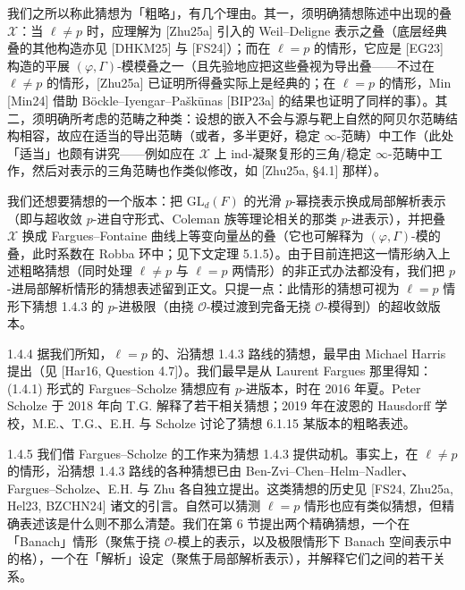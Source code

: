 我们之所以称此猜想为「粗略」，有几个理由。其一，须明确猜想陈述中出现的叠 $\mathcal X$：当 $\ell\neq p$ 时，应理解为 [Zhu25a] 引入的 Weil--Deligne 表示之叠（底层经典叠的其他构造亦见 [DHKM25] 与 [FS24]）；而在 $\ell=p$ 的情形，它应是 [EG23] 构造的平展 $(\varphi,\Gamma)$-模模叠之一（且先验地应把这些叠视为导出叠——不过在 $\ell\neq p$ 的情形，[Zhu25a] 已证明所得叠实际上是经典的；在 $\ell=p$ 的情形，Min [Min24] 借助 Böckle--Iyengar--Paškūnas [BIP23a] 的结果也证明了同样的事）。其二，须明确所考虑的范畴之种类：设想的嵌入不会与源与靶上自然的阿贝尔范畴结构相容，故应在适当的导出范畴（或者，多半更好，稳定 $\infty$-范畴）中工作（此处「适当」也颇有讲究——例如应在 $\mathcal X$ 上 ind-凝聚复形的三角/稳定 $\infty$-范畴中工作，然后对表示的三角范畴也作类似修改，如 [Zhu25a, §4.1] 那样）。

我们还想要猜想的一个版本：把 $\mathrm{GL}_d(F)$ 的光滑 $p$-幂挠表示换成局部解析表示（即与超收敛 $p$-进自守形式、Coleman 族等理论相关的那类 $p$-进表示），并把叠 $\mathcal X$ 换成 Fargues--Fontaine 曲线上等变向量丛的叠（它也可解释为 $(\varphi,\Gamma)$-模的叠，此时系数在 Robba 环中；见下文定理 5.1.5）。由于目前连把这一情形纳入上述粗略猜想（同时处理 $\ell\neq p$ 与 $\ell=p$ 两情形）的非正式办法都没有，我们把 $p$-进局部解析情形的猜想表述留到正文。只提一点：此情形的猜想可视为 $\ell=p$ 情形下猜想 1.4.3 的 $p$-进极限（由挠 $\mathcal O$-模过渡到完备无挠 $\mathcal O$-模得到）的超收敛版本。

\begin{rem}{1.4.4}\label{rem:a4-1-4-4}
据我们所知，$\ell=p$ 的、沿猜想 1.4.3 路线的猜想，最早由 Michael Harris 提出（见 [Har16, Question 4.7]）。我们最早是从 Laurent Fargues 那里得知：(1.4.1) 形式的 Fargues--Scholze 猜想应有 $p$-进版本，时在 2016 年夏。Peter Scholze 于 2018 年向 T.G. 解释了若干相关猜想；2019 年在波恩的 Hausdorff 学校，M.E.、T.G.、E.H. 与 Scholze 讨论了猜想 6.1.15 某版本的粗略表述。
\end{rem}

\begin{rem}{1.4.5}\label{rem:a4-1-4-5}
我们借 Fargues--Scholze 的工作来为猜想 1.4.3 提供动机。事实上，在 $\ell\neq p$ 的情形，沿猜想 1.4.3 路线的各种猜想已由 Ben-Zvi--Chen--Helm--Nadler、Fargues--Scholze、E.H. 与 Zhu 各自独立提出。这类猜想的历史见 [FS24, Zhu25a, Hel23, BZCHN24] 诸文的引言。自然可以猜测 $\ell=p$ 情形也应有类似猜想，但精确表述该是什么则不那么清楚。我们在第 6 节提出两个精确猜想，一个在「Banach」情形（聚焦于挠 $\mathcal O$-模上的表示，以及极限情形下 Banach 空间表示中的格），一个在「解析」设定（聚焦于局部解析表示），并解释它们之间的若干关系。
\end{rem}

